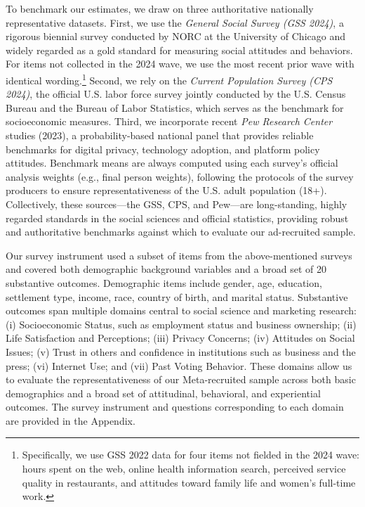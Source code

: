 \documentclass[letterpaper,12pt]{article}
\theoremstyle{proposition}
\begin{document}
To benchmark our estimates, we draw on three authoritative nationally representative datasets. First, we use the \textit{General Social Survey (GSS 2024)}, a rigorous biennial survey conducted by NORC at the University of Chicago and widely regarded as a gold standard for measuring social attitudes and behaviors. For items not collected in the 2024 wave, we use the most recent prior wave with identical wording.\footnote{Specifically, we use GSS 2022 data for four items not fielded in the 2024 wave: hours spent on the web, online health information search, perceived service quality in restaurants, and attitudes toward family life and women’s full-time work.}
 Second, we rely on the \textit{Current Population Survey (CPS 2024)}, the official U.S. labor force survey jointly conducted by the U.S. Census Bureau and the Bureau of Labor Statistics, which serves as the benchmark for socioeconomic measures. Third, we incorporate recent \textit{Pew Research Center} studies (2023), a probability-based national panel that provides reliable benchmarks for digital privacy, technology adoption, and platform policy attitudes. Benchmark means are always computed using each survey’s official analysis weights (e.g., final person weights), following the protocols of the survey producers to ensure representativeness of the U.S. adult population (18+). Collectively, these sources—the GSS, CPS, and Pew—are long-standing, highly regarded standards in the social sciences and official statistics, providing robust and authoritative benchmarks against which to evaluate our ad-recruited sample.

Our survey instrument used a subset of items from the above-mentioned surveys and covered both demographic background variables and a broad set of 20 substantive outcomes. Demographic items include gender, age, education, settlement type, income, race, country of birth, and marital status. Substantive outcomes span multiple domains central to social science and marketing research: (i) Socioeconomic Status, such as employment status and business ownership; (ii) Life Satisfaction and Perceptions; (iii) Privacy Concerns; (iv) Attitudes on Social Issues; (v) Trust in others and confidence in institutions such as business and the press; (vi) Internet Use; and (vii) Past Voting Behavior. These domains allow us to evaluate the representativeness of our Meta-recruited sample across both basic demographics and a broad set of attitudinal, behavioral, and experiential outcomes. The survey instrument and questions corresponding to each domain are provided in the Appendix.
\end{document}
